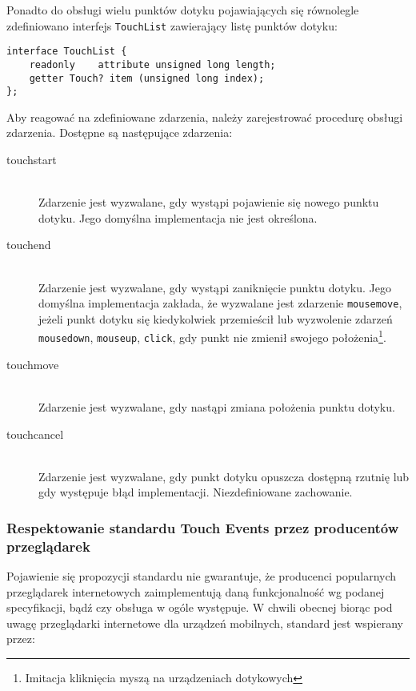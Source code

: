 Ponadto do obsługi wielu punktów dotyku pojawiających się równolegle zdefiniowano interfejs \lstinline{TouchList} zawierający listę punktów dotyku:

\lstset{language=Octave}
\begin{lstlisting}
interface TouchList {
    readonly    attribute unsigned long length;
    getter Touch? item (unsigned long index);
};
\end{lstlisting}

Aby reagować na zdefiniowane zdarzenia, należy zarejestrować procedurę obsługi zdarzenia. Dostępne są następujące zdarzenia:

\begin{description}
  \item[touchstart] \hfill \\
  Zdarzenie jest wyzwalane, gdy wystąpi pojawienie się nowego punktu dotyku. Jego domyślna implementacja nie jest określona.
  \item[touchend] \hfill \\
  Zdarzenie jest wyzwalane, gdy wystąpi zaniknięcie punktu dotyku. Jego domyślna implementacja zakłada, że wyzwalane jest zdarzenie \lstinline{mousemove}, jeżeli punkt dotyku się kiedykolwiek przemieścił lub wyzwolenie zdarzeń \lstinline{mousedown}, \lstinline{mouseup}, \lstinline{click}, gdy punkt nie zmienił swojego położenia\footnote{Imitacja kliknięcia myszą na urządzeniach dotykowych}.
  \item[touchmove] \hfill \\
  Zdarzenie jest wyzwalane, gdy nastąpi zmiana położenia punktu dotyku.
  \item[touchcancel] \hfill \\
  Zdarzenie jest wyzwalane, gdy punkt dotyku opuszcza dostępną rzutnię lub gdy występuje błąd implementacji. Niezdefiniowane zachowanie.
\end{description}

\subsubsection{Respektowanie standardu Touch Events przez producentów przeglądarek}
\label{subsec:w3c-touch-events-implementations}

Pojawienie się propozycji standardu nie gwarantuje, że producenci popularnych przeglądarek internetowych zaimplementują daną funkcjonalność wg podanej specyfikacji, bądź czy obsługa w ogóle występuje. W chwili obecnej biorąc pod uwagę przeglądarki internetowe dla urządzeń mobilnych, standard jest wspierany przez\cite{caniuse-touch-events}:

